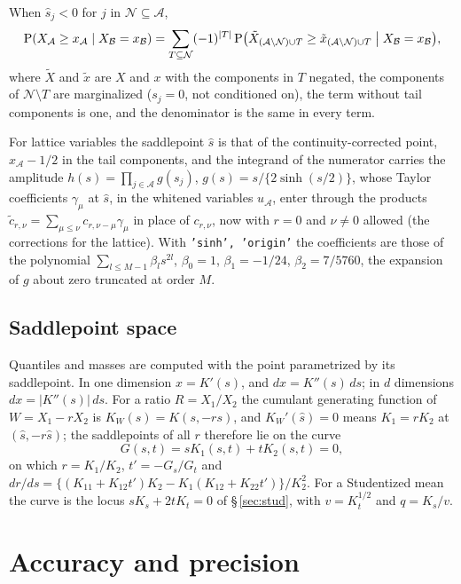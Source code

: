 \documentclass[11pt]{article}
\newcommand{\prog}[1]{\texttt{#1}}
\newcommand{\pr}{\mathrm{P}}
\begin{document}
When $\hat s_j<0$ for $j$ in $\mathcal N\subseteq\mathcal A$,
\[
\pr(X_{\mathcal A}\geq x_{\mathcal A}\mid X_{\mathcal B}=x_{\mathcal B})=
\sum_{T\subseteq\mathcal N}(-1)^{|T|}\,\pr\bigl(\tilde X_{(\mathcal A\setminus\mathcal N)\cup T}\geq\tilde x_{(\mathcal A\setminus\mathcal N)\cup T}\bigm| X_{\mathcal B}=x_{\mathcal B}\bigr),
\]
where $\tilde X$ and $\tilde x$ are $X$ and $x$ with the components in $T$ negated, the components
of $\mathcal N\setminus T$ are marginalized ($s_j=0$, not conditioned on), the term without tail
components is one, and the denominator is the same in every term.

For lattice variables the saddlepoint $\hat s$ is that of the continuity-corrected point,
$x_{\mathcal A}-1/2$ in the tail components, and the integrand of the numerator carries the
amplitude $h(s)=\prod_{j\in\mathcal A}g(s_j)$, $g(s)=s/\{2\sinh(s/2)\}$, whose Taylor coefficients
$\gamma_\mu$ at $\hat s$, in the whitened variables $u_{\mathcal A}$, enter through the products
$\tilde c_{r,\nu}=\sum_{\mu\leq\nu}c_{r,\nu-\mu}\gamma_\mu$ in place of $c_{r,\nu}$, now with
$r=0$ and $\nu\ne0$ allowed (the corrections for the lattice). With \prog{'sinh', 'origin'} the
coefficients are those of the polynomial $\sum_{l\leq M-1}\beta_ls^{2l}$, $\beta_0=1$,
$\beta_1=-1/24$, $\beta_2=7/5760$, the expansion of $g$ about zero truncated at order $M$.

\subsection{Saddlepoint space}\label{sec:bgspace}

Quantiles and masses are computed with the point parametrized by its saddlepoint. In one dimension
$x=K'(s)$, and $dx=K''(s)\,ds$; in $d$ dimensions $dx=|K''(s)|\,ds$. For a ratio $R=X_1/X_2$ the
cumulant generating function of $W=X_1-rX_2$ is $K_W(s)=K(s,-rs)$, and $K_W'(\hat s)=0$ means
$K_1=rK_2$ at $(\hat s,-r\hat s)$; the saddlepoints of all $r$ therefore lie on the curve
\[
G(s,t)=sK_1(s,t)+tK_2(s,t)=0,
\]
on which $r=K_1/K_2$, $t'=-G_s/G_t$ and $dr/ds=\{(K_{11}+K_{12}t')K_2-K_1(K_{12}+K_{22}t')\}/K_2^2$. For a
Studentized mean the curve is the locus $sK_s+2tK_t=0$ of \S\,\ref{sec:stud}, with $v=K_t^{1/2}$ and
$q=K_s/v$.

\section{Accuracy and precision}\label{sec:precision}
\end{document}
